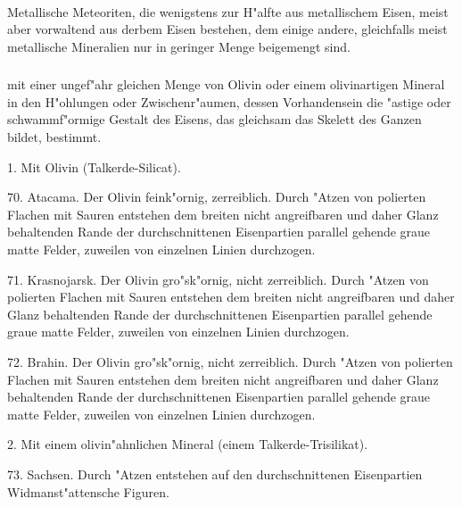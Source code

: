 \documentclass[a4paper, 11pt, oneside, polutonikogreek, german]{article}
\begin{document}
\paragraph{}
Metallische Meteoriten, die wenigstens zur H"alfte aus metallischem Eisen, meist aber vorwaltend aus derbem Eisen bestehen, dem einige andere, gleichfalls meist metallische Mineralien nur in geringer Menge beigemengt sind.
\subsubsection[\frakfamily{"Astiges Meteoreisen.}]{}
mit einer ungef"ahr gleichen Menge von Olivin oder einem olivinartigen Mineral in den H"ohlungen oder Zwischenr"aumen, dessen Vorhandensein die "astige oder schwammf"ormige Gestalt des Eisens, das gleichsam das Skelett des Ganzen bildet, bestimmt.

\vspace{2ex}

1. Mit Olivin (Talkerde-Silicat).

\vspace{2ex}

70. Atacama. Der Olivin feink"ornig, zerreiblich. Durch "Atzen von polierten Flachen mit Sauren entstehen dem breiten nicht angreifbaren und daher Glanz behaltenden Rande der durchschnittenen Eisenpartien parallel gehende graue matte Felder, zuweilen von einzelnen Linien durchzogen.

71. Krasnojarsk. Der Olivin gro"sk"ornig, nicht zerreiblich. Durch "Atzen von polierten Flachen mit Sauren entstehen dem breiten nicht angreifbaren und daher Glanz behaltenden Rande der durchschnittenen Eisenpartien parallel gehende graue matte Felder, zuweilen von einzelnen Linien durchzogen.

72. Brahin. Der Olivin gro"sk"ornig, nicht zerreiblich. Durch "Atzen von polierten Flachen mit Sauren entstehen dem breiten nicht angreifbaren und daher Glanz behaltenden Rande der durchschnittenen Eisenpartien parallel gehende graue matte Felder, zuweilen von einzelnen Linien durchzogen.

\vspace{2ex}

2. Mit einem olivin"ahnlichen Mineral (einem Talkerde-Trisilikat).

\vspace{2ex}

73. Sachsen. Durch "Atzen entstehen auf den durchschnittenen Eisenpartien Widmanst"attensche Figuren.
\end{document}
